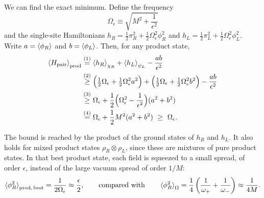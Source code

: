 We can find the exact minimum. Define the frequency
\[
\Omega_\epsilon \equiv \sqrt{M^2 + \frac{1}{\epsilon^2}}
\]
and the single-site Hamiltonians $h_R = \tfrac12\pi_R^2+\tfrac12\Omega_\epsilon^2\phi_R^2$ and $h_L =
\tfrac12\pi_L^2+\tfrac12\Omega_\epsilon^2\phi_L^2$. Write $a=\braket{\phi_R}$ and $b=\braket{\phi_L}$. Then,
for any product state,
\begin{align}
\braket{H_{\rm pair}}_{\rm prod}
&\eqstep{1} \braket{h_R}_{\chi_R} + \braket{h_L}_{\psi_L} - \frac{ab}{\epsilon^2} \notag\\
&\geqstep{2} \Big(\tfrac12\Omega_\epsilon + \tfrac12\Omega_\epsilon^2a^2\Big)
+ \Big(\tfrac12\Omega_\epsilon + \tfrac12\Omega_\epsilon^2b^2\Big) - \frac{ab}{\epsilon^2} \notag\\
&\geqstep{3} \Omega_\epsilon + \frac12\Big(\Omega_\epsilon^2-\frac1{\epsilon^2}\Big)(a^2+b^2) \notag\\
&\eqstep{4} \Omega_\epsilon + \frac12 M^2(a^2+b^2) \ \ge\ \Omega_\epsilon .
\label{eq:prod_fluctuation_lower_bound}
\end{align}
\quad
{}\quad
{}\quad
{}

The bound is reached by the product of the ground states of $h_R$ and $h_L$. It also holds for mixed
product states $\rho_R\otimes\rho_L$, since these are mixtures of pure product states. In that best product
state, each field is squeezed to a small spread, of order $\epsilon$, instead of the large vacuum spread of
order $1/M$:
\begin{equation}
\braket{\phi_R^2}_{\rm prod,\,best} = \frac{1}{2\Omega_\epsilon} \approx \frac{\epsilon}{2},
\qquad\text{compared with}\qquad
\braket{\phi_R^2}_\Omega = \frac14\left(\frac1{\omega_+}+\frac1{\omega_-}\right) \approx \frac{1}{4M} .
\label{eq:hcut_prod_divergence}
\end{equation}

